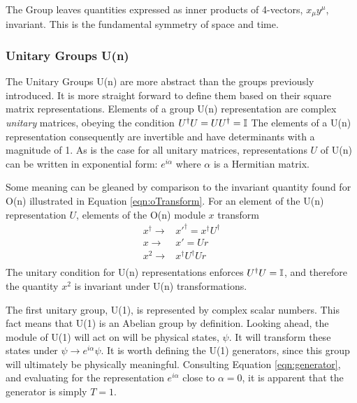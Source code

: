 
The \poincare Group leaves quantities expressed as inner products of 4-vectors, $x_\mu y^\mu$, invariant.
This is the fundamental symmetry of space and time. 

\subsubsection{Unitary Groups U(n)}\label{sec:unitary}

The Unitary Groups U(n) are more abstract than the groups previously introduced.
It is more straight forward to define them based on their \nxn square matrix representations.
Elements of a group U(n) representation are complex \emph{unitary} matrices, obeying the condition $U^\dagger U=UU^\dagger=\mathbb{I}$
The elements of a U(n) representation consequently are invertible and have determinants with a magnitude of 1.
As is the case for all unitary matrices, representations $U$ of U(n) can be written in exponential form: $e^{i\alpha}$ where $\alpha$ is a Hermitian matrix.

Some meaning can be gleaned by comparison to the invariant quantity found for O(n) illustrated in Equation \ref{eqn:oTransform}.
For an element of the U(n) representation $U$, elements of the O(n) module $x$ transform 
\begin{equation}\begin{split}\label{eqn:uTransform}
    x^\dagger\to&x'^\dagger=x^\dagger U^\dagger \\
    x\to&x'=Ur \\
    x^2\to&x^\dagger U^\dagger Ur \\
\end{split}\end{equation}
The unitary condition for U(n) representations enforces $U^\dagger U=\mathbb{I}$, and therefore the quantity $x^2$ is invariant under U(n) transformations.

The first unitary group, U(1), is represented by complex scalar numbers.
This fact means that U(1) is an Abelian group by definition.
Looking ahead, the module of U(1) will act on will be physical states, $\psi$.
It will transform these states under $\psi\to e^{i\alpha}\psi$.
It is worth defining the U(1) generators, since this group will ultimately be physically meaningful.
Consulting Equation \ref{eqn:generator}, and evaluating for the representation $e^{i\alpha}$ close to $\alpha=0$, it is apparent that the generator is simply $T=1$.

